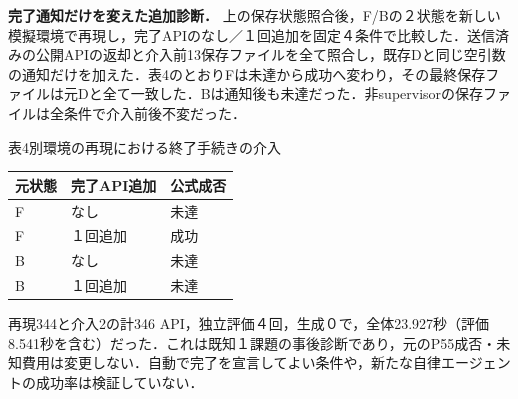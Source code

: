 \par\smallskip\noindent\textbf{完了通知だけを変えた追加診断．}
上の保存状態照合後，F/Bの２状態を新しい模擬環境で再現し，完了APIのなし／１回追加を固定４条件で比較した．送信済みの公開APIの返却と介入前13保存ファイルを全て照合し，既存Dと同じ空引数の通知だけを加えた．表4のとおりFは未達から成功へ変わり，その最終保存ファイルは元Dと全て一致した．Bは通知後も未達だった．非supervisorの保存ファイルは全条件で介入前後不変だった．
\begin{center}\small 表4\quad 別環境の再現における終了手続きの介入\par\smallskip
\begin{tabular}{lll}\hline 元状態 & 完了API追加 & 公式成否\\\hline
F & なし & 未達\\
F & １回追加 & 成功\\
B & なし & 未達\\
B & １回追加 & 未達\\
\hline\end{tabular}\end{center}
再現344と介入2の計346 API，独立評価４回，生成０で，全体23.927秒（評価8.541秒を含む）だった．これは既知１課題の事後診断であり，元のP55成否・未知費用は変更しない．自動で完了を宣言してよい条件や，新たな自律エージェントの成功率は検証していない．
